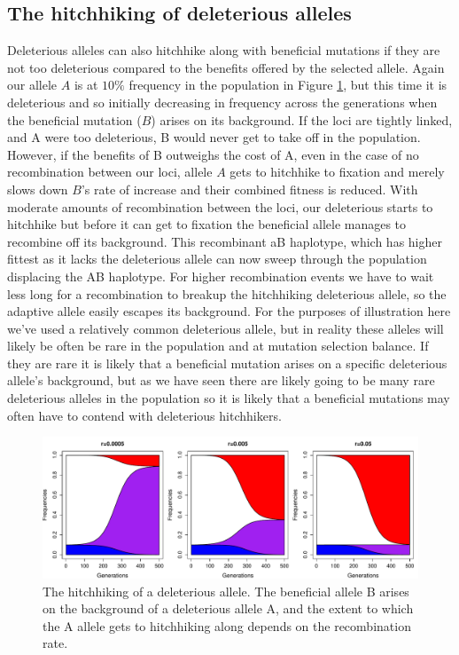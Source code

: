 \subsection{The hitchhiking of deleterious alleles}
Deleterious alleles can also hitchhike along with beneficial mutations if they are not too deleterious compared to the benefits offered by the selected allele. Again our allele $A$ is at $10\%$ frequency in the population in Figure \ref{fig:deleterious_HH}, but this time it is deleterious and so initially decreasing in frequency across the generations when the beneficial mutation ($B$) arises on its background. If the loci are tightly linked, and A were too deleterious, B would never get to take off in the population.   However, if the benefits of B outweighs the cost of A, even in the case of no recombination between our loci, allele $A$ gets to hitchhike to fixation and merely slows down $B$'s rate of increase and their combined fitness is reduced. With moderate amounts of recombination between the loci, our deleterious starts to hitchhike but before it can get to fixation the beneficial allele manages to recombine off its background. This recombinant aB haplotype, which has higher fittest as it lacks the deleterious allele can now sweep through the population displacing the AB haplotype. For higher recombination events we have to wait less long for a recombination to breakup the hitchhiking deleterious allele, so the adaptive allele easily escapes its background.
For the purposes of illustration here we've used a relatively common deleterious allele, but in reality these alleles will likely be often be rare in the population and at mutation selection balance. If they are rare it is likely that a beneficial mutation arises on a specific deleterious allele's background, but as we have seen there are likely going to be many rare deleterious alleles in the population so it is likely that a beneficial mutations may often have to contend with deleterious hitchhikers. 
\begin{figure}
\begin{center}
  \includegraphics[width = 0.9 \textwidth]{figures/selection_recom_interaction/Deleterious_Hitchhiking.pdf}
  \caption{The hitchhiking of a deleterious allele. The beneficial allele B arises on the background of a deleterious allele A, and the extent to which the A allele gets to hitchhiking along depends on the recombination rate. } \label{fig:deleterious_HH}  %
  \end{center}
\end{figure}


